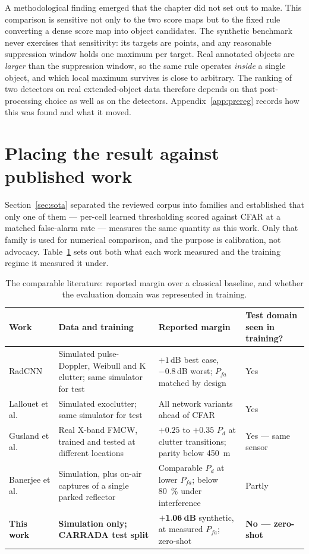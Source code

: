 A methodological finding emerged that the chapter did not set out to make. This comparison is
sensitive not only to the two score maps but to the fixed rule converting a dense score map into
object candidates. The synthetic benchmark never exercises that sensitivity: its targets are points,
and any reasonable suppression window holds one maximum per target. Real annotated objects are
\emph{larger} than the suppression window, so the same rule operates \emph{inside} a single object,
and which local maximum survives is close to arbitrary. The ranking of two detectors on real
extended-object data therefore depends on that post-processing choice as well as on the detectors.
Appendix~\ref{app:prereg} records how this was found and what it moved.

\section{Placing the result against published work}
\label{sec:litcompare}

Section~\ref{sec:sota} separated the reviewed corpus into families and established that only one of
them --- per-cell learned thresholding scored against CFAR at a matched false-alarm rate --- measures
the same quantity as this work. Only that family is used for numerical comparison, and the purpose is
calibration, not advocacy. Table~\ref{tab:lit_regime} sets out both what each work measured and the
training regime it measured it under.

\begin{table}[H]
\centering\small
\caption{The comparable literature: reported margin over a classical baseline, and whether the
evaluation domain was represented in training.}
\label{tab:lit_regime}
\begin{tabular}{@{}p{2.6cm}p{4.1cm}p{4.2cm}p{2.6cm}@{}}
\toprule
\textbf{Work} & \textbf{Data and training} & \textbf{Reported margin} &
\textbf{Test domain seen in training?} \\
\midrule
RadCNN~\cite{yavuz2021radcnn} & Simulated pulse-Doppler, Weibull and K clutter; same simulator for
test & $+1$\,dB best case, $-0.8$\,dB worst; $P_{fa}$ matched by design & Yes \\
\addlinespace
Lallouet et al.~\cite{lallouet2023loss} & Simulated exoclutter; same simulator for test &
All network variants ahead of CFAR & Yes \\
\addlinespace
Gusland et al.~\cite{gusland2020deeptemporal} & Real X-band FMCW, trained and tested at different
locations & $+0.25$ to $+0.35$ $P_d$ at clutter transitions; parity below \SI{450}{\metre} &
Yes --- same sensor \\
\addlinespace
Banerjee et al.~\cite{banerjee2025rctd} & Simulation, plus on-air captures of a single parked
reflector & Comparable $P_d$ at lower $P_{fa}$; below \SI{80}{\percent} under interference &
Partly \\
\midrule
\textbf{This work} & \textbf{Simulation only; CARRADA test split} &
$\mathbf{+1.06}$\,\textbf{dB} synthetic, at measured $P_{fa}$;
\textbf{\RoneDelta{}} zero-shot & \textbf{No --- zero-shot} \\
\bottomrule
\end{tabular}
\end{table}

